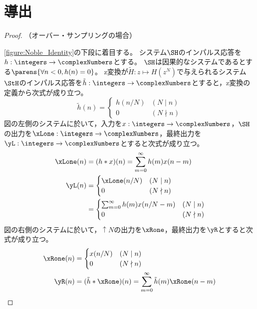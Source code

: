     \section{導出}
        \begin{proof}
            （オーバー・サンプリングの場合）
            \par\noindent
            \cref{figure:Noble_Identity}の下段に着目する。
            システム$\SH$のインパルス応答を$h:\integers\to\complexNumbers$とする。
            $\SH$は因果的なシステムであるとする$\parens{\forall n<0,h(n)=0}$。
            z変換が$\tilde{H}:z\mapsto H(z^N)$で与えられるシステム$\StH$のインパルス応答を$\tilde{h}:\integers\to\complexNumbers$とすると，z変換の定義から次式が成り立つ。
            \[
                \tilde{h}(n) = \begin{cases}
                    h(n/N) & (N\mid n) \\
                    0 & (N\nmid n)
                \end{cases} \tag{1}
            \]
            図の左側のシステムに於いて，入力を$x:\integers\to\complexNumbers$，$\SH$の出力を$\xLone:\integers\to\complexNumbers$，最終出力を$\yL:\integers\to\complexNumbers$とすると次式が成り立つ。
            \begin{align*}
                \xLone(n) &= (h*x)(n) = \sum_{m=0}^\infty h(m)x(n-m) \\
                \yL(n) &= \begin{cases}
                    \xLone(n/N) & (N\mid n) \\
                    0 & (N\nmid n)
                \end{cases} \\
                &= \begin{cases}
                    \sum_{m=0}^\infty h(m)x(n/N-m) & (N\mid n) \\
                    0 & (N\nmid n)
                \end{cases}
            \end{align*}
            図の右側のシステムに於いて，$\uparrow N$の出力を$\xRone$，最終出力を$\yR$とすると次式が成り立つ。
            \begin{align*}
                \xRone(n) &= \begin{cases}
                    x(n/N) & (N\mid n) \\
                    0 & (N\nmid n)
                \end{cases} \\
                \yR(n) &= (\tilde{h}*\xRone)(n) = \sum_{m=0}^\infty \tilde{h}(m)\xRone(n-m) \\

\end{align*}
\end{proof}
